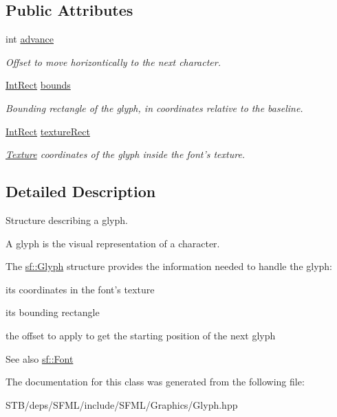 \subsection*{Public Attributes}
\begin{DoxyCompactItemize}
\item 
\hypertarget{classsf_1_1_glyph_a50b93f441db501d10308007f63382166}{int \hyperlink{classsf_1_1_glyph_a50b93f441db501d10308007f63382166}{advance}}\label{classsf_1_1_glyph_a50b93f441db501d10308007f63382166}

\begin{DoxyCompactList}\small\item\em Offset to move horizontically to the next character. \end{DoxyCompactList}\item 
\hypertarget{classsf_1_1_glyph_afe4cd37e5839955d7dd008e178d41f0c}{\hyperlink{classsf_1_1_rect}{Int\+Rect} \hyperlink{classsf_1_1_glyph_afe4cd37e5839955d7dd008e178d41f0c}{bounds}}\label{classsf_1_1_glyph_afe4cd37e5839955d7dd008e178d41f0c}

\begin{DoxyCompactList}\small\item\em Bounding rectangle of the glyph, in coordinates relative to the baseline. \end{DoxyCompactList}\item 
\hypertarget{classsf_1_1_glyph_a0d502d326449f8c49011ed91d2805f5b}{\hyperlink{classsf_1_1_rect}{Int\+Rect} \hyperlink{classsf_1_1_glyph_a0d502d326449f8c49011ed91d2805f5b}{texture\+Rect}}\label{classsf_1_1_glyph_a0d502d326449f8c49011ed91d2805f5b}

\begin{DoxyCompactList}\small\item\em \hyperlink{classsf_1_1_texture}{Texture} coordinates of the glyph inside the font's texture. \end{DoxyCompactList}\end{DoxyCompactItemize}


\subsection{Detailed Description}
Structure describing a glyph. 

A glyph is the visual representation of a character.

The \hyperlink{classsf_1_1_glyph}{sf\+::\+Glyph} structure provides the information needed to handle the glyph\+: \begin{DoxyItemize}
\item its coordinates in the font's texture \item its bounding rectangle \item the offset to apply to get the starting position of the next glyph\end{DoxyItemize}
\begin{DoxySeeAlso}{See also}
\hyperlink{classsf_1_1_font}{sf\+::\+Font} 
\end{DoxySeeAlso}


The documentation for this class was generated from the following file\+:\begin{DoxyCompactItemize}
\item 
S\+T\+B/deps/\+S\+F\+M\+L/include/\+S\+F\+M\+L/\+Graphics/Glyph.\+hpp\end{DoxyCompactItemize}
